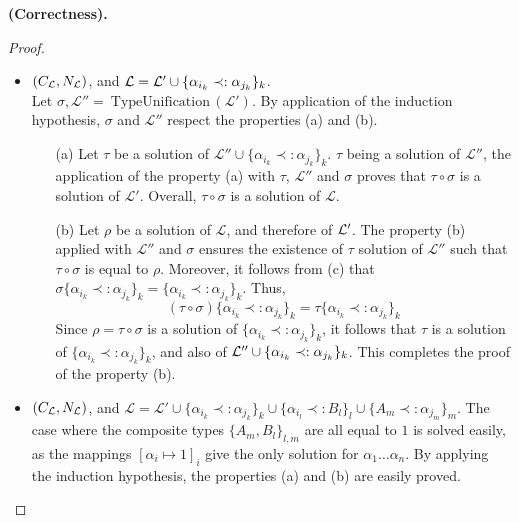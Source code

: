 \begin{thm}{\bf (Correctness).}
\begin{proof}
\begin{itemize}
			\item $(C_{\mathcal{L}}, N_{\mathcal{L}})$, and $\mathcal{L} = \mathcal{L}' \cup \{ \alpha_{i_k} \prec: \alpha_{j_k} \}_k$. \\
				Let $\sigma, \mathcal{L''} = ~\text{TypeUnification}\,(\mathcal{L'})$. By application of the induction hypothesis, $\sigma$ and
				$\mathcal{L''}$ respect the properties (a) and (b).
					\begin{itemize}
						\item[(a)] Let $\tau$ be a solution of $\mathcal{L''} \cup \{ \alpha_{i_k} \prec: \alpha_{j_k} \}_k$.
							$\tau$ being a solution of $\mathcal{L''}$, the application of the property (a) with $\tau$, $\mathcal{L''}$ and
							$\sigma$ proves that $\tau \circ \sigma$ is a solution of $\mathcal{L'}$. Overall, $\tau \circ \sigma$ is a
							solution of $\mathcal{L}$.
							
						\item[(b)] Let $\rho$ be a solution of $\mathcal{L}$, and therefore of $\mathcal{L}'$.
							The property (b) applied with $\mathcal{L''}$ and $\sigma$ ensures the existence
							of $\tau$ solution of $\mathcal{L''}$ such that $\tau \circ \sigma$ is equal to $\rho$. Moreover, it follows from (c) that
							$\sigma \{ \alpha_{i_k} \prec: \alpha_{j_k} \}_k = \{\alpha_{i_k} \prec: \alpha_{j_k} \}_k$. Thus,
								$$(\tau \circ \sigma) \{\alpha_{i_k} \prec: \alpha_{j_k} \}_k = \tau \{\alpha_{i_k} \prec: \alpha_{j_k} \}_k$$
							Since $\rho = \tau \circ \sigma$ is a solution of $\{\alpha_{i_k} \prec: \alpha_{j_k} \}_k$, it follows that $\tau$ is a solution of
							$\{\alpha_{i_k} \prec: \alpha_{j_k} \}_k$, and also of $\mathcal{L}'' \cup \{\alpha_{i_k} \prec: \alpha_{j_k} \}_k$. This completes
							the proof of the property (b).
					\end{itemize}
			
			\item $(C_{\mathcal{L}}, N_{\mathcal{L}})$, and $\mathcal{L} = \mathcal{L'} \cup \{ \alpha_{i_k} \prec: \alpha_{j_k} \}_k \cup
				\{ \alpha_{i_l} \prec: B_l \}_l \cup \{ A_m \prec: \alpha_{j_m} \}_m$.
				The case where the composite types $\{ A_m, B_l \}_{l, m}$ are all equal to $1$ is solved easily, as the mappings
				$[\alpha_i \mapsto 1]_i$ give the only solution for $\alpha_1 \dots \alpha_n$.
				By applying the induction hypothesis, the properties (a) and (b) are easily proved. \\
				

\end{itemize}
\end{proof}
\end{thm}
